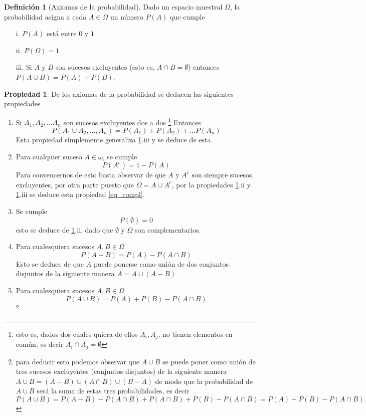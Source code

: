 \documentclass[]{book}
\theoremstyle{plain}
\theoremstyle{definition}
\newtheorem{definition}[theorem]{Definición}
\newtheorem{property}[theorem]{Propiedad}
\begin{document}
\begin{definition}[Axiomas de la probabilidad]\label{def_axiom}
Dado un espacio muestral $\Omega$, la probabilidad asigna a cada $A\in \Omega$ un número
$P(A)$ que cumple
\begin{enumerate}
  \item[i.] $P(A)$ está entre $0$ y $1$
  \item[ii.] $P(\Omega) = 1$
  \item[iii.] Si $A$ y $B$ son sucesos excluyentes (esto es, $A\cap B = \emptyset$) entonces $P(A\cup B) = P(A) + P(B)$.
\end{enumerate}
\end{definition}

\begin{property}\label{prop_3}
  De los axiomas de la probabilidad se deducen las siguientes propiedades
\begin{enumerate}[(1)]
  \item Si $A_1, A_2, \ldots A_n$ son sucesos excluyentes dos a dos \footnote{esto es, dados dos cuales quiera de ellos $A_i, A_j$, no tienen elementos en común, es decir $A_i\cap A_j = \emptyset$}
  Entonces $$P(A_1 \cup A_2, \ldots, A_n)=P(A_1) + P(A_2) + \ldots P(A_n)$$
  Esta propiedad símplemente generaliza \ref{def_axiom}.iii y se deduce de esta.
  \item Para cualquier suceso $A\in \omega$, se cumple
  \begin{equation}\label{eq_compl}
    P(A^c) = 1-P(A)
  \end{equation}
  Para convencernos de esto basta observar de que $A$ y $A^c$ son siempre sucesos excluyentes, 
  por otra parte puesto que $\Omega = A \cup A^c$, por la propiedades \ref{def_axiom}.ii y \ref{def_axiom}.iii se deduce esta propiedad \ref{eq_compl}. 
  \item Se cumple
  \[P(\emptyset) = 0 \]
  esto se deduce de \ref{def_axiom}.ii, dado que $\emptyset$ y $\Omega$ son complementarios.
  \item Para cualesquiera sucesos $A,B\in \Omega$
  \[P(A-B)= P(A) - P(A\cap B)\]
  Esto se deduce de que $A$ puede ponerse como unión de dos conjuntos disjuntos de la siguiente manera $A = A \cup (A-B)$
  \item Para cualesquiera sucesos $A,B\in \Omega$
  \[P(A\cup B) = P(A) + P(B) - P(A\cap B)\]
  \footnote{para deducir esto podemos observar que $A\cup B $ se puede poner como unión de tres sucesos excluyentes (conjuntos disjuntos) de la siguiente manera 
   $A\cup B = (A-B) \cup (A\cap B) \cup (B-A)$ de modo que la probabilidad de $A\cup B$ será la suma de estas tres probabilidades, es decir 
   \[P(A\cup B) = P(A-B) - P(A\cap B) + P(A\cap B) + P(B) - P(A\cap B) = P(A) + P(B) - P(A\cap B) \]}
\end{enumerate}
\end{property}
\end{document}
